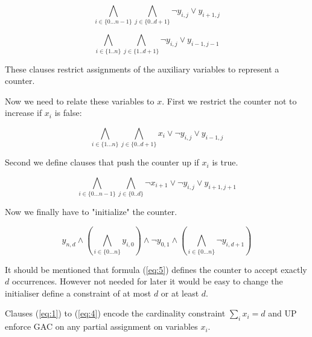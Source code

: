 \documentclass[]{llncs}
\begin{document}
\begin{equation} \label{eq:1}
    \bigwedge_{i \in \{0\ldots n-1\}} \bigwedge_{j \in\{0..d+1\}}
    \neg y_{i,j} \vee y_{i+1,j}
\end{equation}

\begin{equation} \label{eq:2}
    \bigwedge_{i \in \{1..n\}} \bigwedge_{j\in \{1..d+1\}}
    \neg y_{i,j} \vee y_{i-1,j-1}
\end{equation}

These clauses restrict assignments of the auxiliary variables to 
represent a counter.

Now we need to relate these variables to $x$.  First we restrict the
counter not to increase if $x_{i}$ is false:

\begin{equation} \label{eq:3}
    \bigwedge_{i \in \{1\ldots n\}} \bigwedge_{j\in\{0..d+1\}}
    x_{i} \vee \neg y_{i,j} \vee y_{i-1,j}
\end{equation}

Second we define clauses that push  the counter up if $x_i$ is true. 

\begin{equation} \label{eq:4}
    \bigwedge_{i \in \{0\ldots n-1\}} \bigwedge_{j\in\{0..d\}}
    \neg x_{i+1} \vee \neg y_{i,j} \vee y_{i+1,j+1}
\end{equation}

Now we finally have to "initialize" the counter. 

\begin{equation} \label{eq:5}
    y_{n,d} \wedge \left (\bigwedge_{i\in\{0\ldots n\}} y_{i,0} \right )\wedge \neg
    y_{0,1} \wedge \left(\bigwedge_{i\in\{0\ldots n\}} \neg
        y_{i,d+1}\right )
\end{equation}

It should be mentioned that formula (\ref{eq:5}) defines the counter to
accept exactly $d$ occurrences. However not needed for later it would be
easy to change the initialiser define a constraint of at most $d$ or at
least $d$. 

\begin{proposition} 
    Clauses (\ref{eq:1}) to (\ref{eq:4}) encode the cardinality
    constraint $ \sum_{i} x_{i} = d $ and UP enforce GAC on any partial
    assignment on variables $x_i$. 
\end{proposition}
\end{document}
